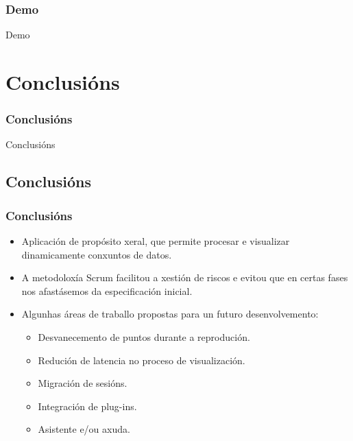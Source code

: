 \documentclass{beamer}
\begin{document}
\begin{frame}
\frametitle{Demo} 
Demo
\end{frame}


\section{Conclusións} 

\begin{frame}
\frametitle{Conclusións} 
Conclusións
\end{frame}

\subsection{Conclusións}
\begin{frame}
\frametitle{Conclusións} 
\begin{itemize}
\item Aplicación de propósito xeral, que permite procesar e visualizar dinamicamente conxuntos de datos.
\item A metodoloxía Scrum facilitou a xestión de riscos e evitou que en certas fases nos afastásemos da especificación inicial.
\item Algunhas áreas de traballo propostas para un futuro desenvolvemento:
\begin{itemize}
\item Desvanecemento de puntos durante a reprodución.
\item Redución de latencia no proceso de visualización.
\item Migración de sesións.
\item Integración de plug-ins.
\item Asistente e/ou axuda.
\end{itemize}
\end{itemize} 
\end{frame}
\end{document}
